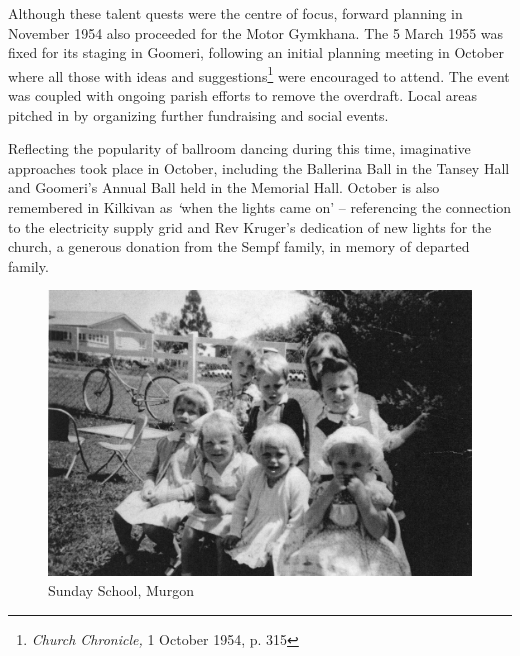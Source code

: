 Although these talent quests were the centre of focus, forward planning in November 1954 also proceeded for the Motor Gymkhana. The 5 March 1955 was fixed for its staging in Goomeri, following an initial planning meeting in October where all those with ideas and suggestions\footnote{\emph{Church Chronicle,} 1 October 1954, p. 315} were encouraged to attend. The event was coupled with ongoing parish efforts to remove the overdraft. Local areas pitched in by organizing further fundraising and social events.


Reflecting the popularity of ballroom dancing during this time, imaginative approaches took place in October, including the Ballerina Ball in the Tansey Hall and Goomeri's Annual Ball held in the Memorial Hall. October is also remembered in Kilkivan as \emph{`}when the lights came on' -- referencing the connection to the electricity supply grid and Rev Kruger's dedication of new lights for the church, a generous donation from the Sempf family, in memory of departed family.









\begin{figure}
\begin{center}
\includegraphics[width=1.\linewidth,center]{../images/sundaySchoolMurgon.jpg}
\caption{Sunday School, Murgon}
\end{center}
\end{figure}




